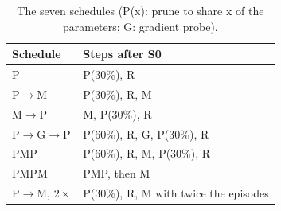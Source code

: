 \begin{table}[t]
  \centering\footnotesize\setlength{\tabcolsep}{4pt}
  \begin{tabular}{@{}ll@{}}
    \toprule
    Schedule & Steps after S0 \\
    \midrule
    P & P(30\%), R \\
    P$\to$M & P(30\%), R, M \\
    M$\to$P & M, P(30\%), R \\
    P$\to$G$\to$P & P(60\%), R, G, P(30\%), R \\
    PMP & P(60\%), R, M, P(30\%), R \\
    PMPM & PMP, then M \\
    P$\to$M, $2\times$ & P(30\%), R, M with twice the episodes \\
    \bottomrule
  \end{tabular}
  \caption{The seven schedules (P(x): prune to share x of the parameters; G: gradient probe).}
  \label{tab:schedules}
\end{table}
